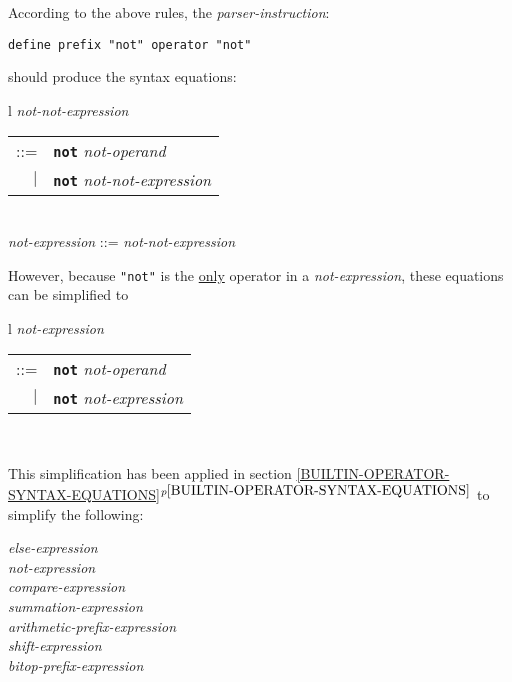 \documentclass[12pt]{article}
\newcommand{\TT}[1]{{\tt \bfseries #1}}
\newcommand{\itemref}[1]{\ref{#1}$^{p\pageref{#1}}$}
\begin{document}
According to the above rules, the {\em parser-instruction}:
\begin{center}
{\tt define prefix "not" operator "not"}
\end{center}
should produce the syntax equations:
\begin{center}
\begin{tabular}{l}
{\em not-not-expression} \begin{tabular}[t]{rl}
		     ::= & \TT{not} {\em not-operand} \\
		     $|$ & \TT{not} {\em not-not-expression} \\
		     \end{tabular} \\
{\em not-expression} ::= {\em not-not-expression} \\
\end{tabular}
\end{center}
However, because {\tt "not"} is the \underline{only} operator in
a {\em not-expression}, these equations can be simplified to
\begin{center}
\begin{tabular}{l}
{\em not-expression} \begin{tabular}[t]{rl}
		     ::= & \TT{not} {\em not-operand} \\
		     $|$ & \TT{not} {\em not-expression} \\
		     \end{tabular} \\
\end{tabular}
\end{center}
This simplification has been applied in section 
\itemref{BUILTIN-OPERATOR-SYNTAX-EQUATIONS} to simplify the following:
\begin{center}
{\em else-expression} \\
{\em not-expression} \\
{\em compare-expression} \\
{\em summation-expression} \\
{\em arithmetic-prefix-expression} \\
{\em shift-expression} \\
{\em bitop-prefix-expression}
\end{center}
\end{document}
